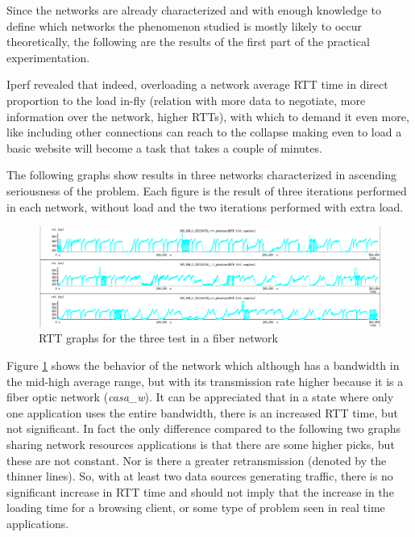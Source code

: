 Since the networks are already characterized and with enough knowledge to
define which networks the phenomenon studied  is mostly likely to occur
theoretically, the following are the results of the first part of the
practical experimentation.

Iperf revealed that indeed, overloading a network average RTT time in direct
proportion to the load in-fly (relation with more data to negotiate, more
information over the network, higher RTTs), with which to demand it even more,
like including other connections can reach to the collapse making even to load
a basic website will become a task that takes a couple of minutes.

The following graphs show results in three networks characterized in ascending
seriousness of the problem. Each figure is the result of three iterations
performed in each network, without load and the two iterations performed with
extra load.

\begin{figure}[ht]
\centering
    \includegraphics[width=\textwidth]{img/n_iperf_good}
\caption[Iperf: RTT graphs for a fiber network]{RTT graphs for the three test in a fiber network}
\label{fig:iperfgood}
\end{figure}%

Figure \ref{fig:iperfgood} shows the behavior of the network which although
has a bandwidth in the mid-high average range, but with its transmission rate
higher because it is a fiber optic network (\textit{casa\_w}). It can be
appreciated that in a state where only one application uses the entire
bandwidth, there is an increased RTT time, but not significant. In fact the
only difference compared to the following two graphs sharing network resources
applications is that there are some higher picks, but these are not constant.
Nor is there a greater retransmission (denoted by the thinner lines). So, with
at least two data sources generating traffic, there is no significant increase
in RTT time and should not imply that the increase in the loading time for a
browsing client, or some type of problem seen in real time applications.

